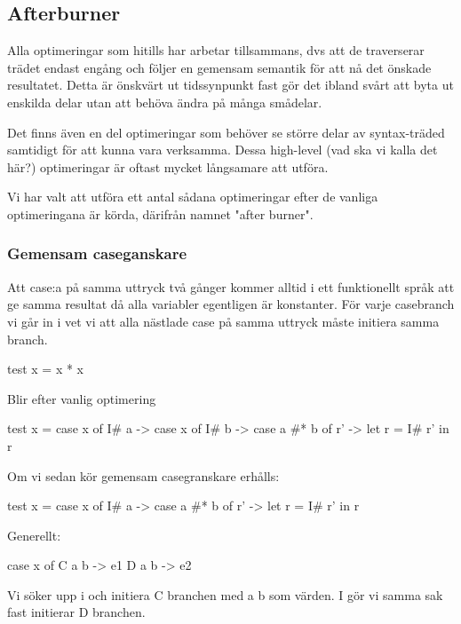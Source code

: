 \documentclass[../Optimise]{subfiles}
\begin{document}
\subsection{Afterburner}

Alla optimeringar som hitills har arbetar tillsammans, dvs att de traverserar trädet endast engång och följer en gemensam semantik för att nå det önskade resultatet. Detta är önskvärt ut tidssynpunkt fast gör det ibland svårt att byta ut enskilda delar utan att behöva ändra på många smådelar.

Det finns även en del optimeringar som behöver se större delar av syntax-träded
samtidigt för att kunna vara verksamma. Dessa high-level (vad ska vi kalla det här?)
optimeringar är oftast mycket långsamare att utföra.

Vi har valt att utföra ett antal sådana optimeringar efter de vanliga
optimeringana är körda, därifrån namnet "after burner".

\subsubsection{Gemensam caseganskare}

Att case:a på samma uttryck två gånger kommer alltid i ett funktionellt språk att ge
samma resultat då alla variabler egentligen är konstanter. För varje casebranch
vi går in i vet vi att alla nästlade case på samma uttryck måste initiera samma
branch.

\begin{codeEx}
test x = x * x
\end{codeEx}

Blir efter vanlig optimering

\begin{codeEx}
test x = case x of
            I# a -> case x of
                I# b -> case a #* b of
                    r' -> let r = I# r'
                            in r
\end{codeEx}

Om vi sedan kör gemensam casegranskare erhålls:
\begin{codeEx}
test x = case x of
            I# a -> case a #* b of
                r' -> let r = I# r'
                    in r
\end{codeEx}

Generellt:
		\begin{codeEx}
case x of
    C a b -> e1
    D a b -> e2
\end{codeEx}
Vi söker upp  i  och initiera C branchen med a b som värden. I  gör vi samma sak fast initierar D branchen.
\end{document}
